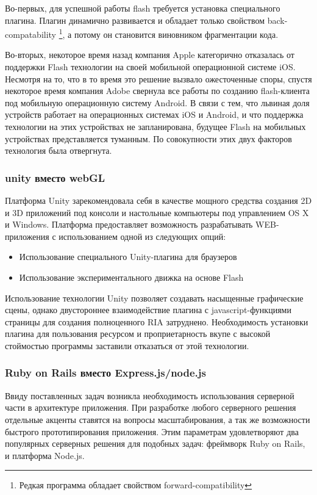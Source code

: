 \documentclass[12pt, a4paper]{article}
\begin{document}
Во-первых, для успешной работы flash требуется установка специального плагина. Плагин
динамично развивается и обладает только свойством back-compatability
\footnote{Редкая программа обладает свойством forward-compatibility}, а потому он
становится виновником фрагментации кода.

Во-вторых, некоторое время назад компания Apple категорично отказалась от
поддержки Flash технологии на своей мобильной операционной системе iOS. Несмотря
на то, что в то время это решение вызвало ожесточенные споры, спустя некоторое
время компания Adobe свернула все работы по созданию flash-клиента под мобильную
операционную систему Android. В связи с тем, что львиная доля устройств работает
на операционных системах iOS и Android, и что поддержка технологии на этих
устройствах не запланирована, будущее Flash на мобильных устройствах
представляется туманным. По совокупности этих двух факторов технология была
отвергнута.

\subsubsection{unity вместо webGL}
Платформа Unity зарекомендовала себя в качестве мощного средства создания 2D и
3D приложений под консоли и настольные компьютеры под управлением OS X и
Windows. Платформа предоставляет возможность разрабатывать WEB-приложения с
использованием одной из следующих опций:
\begin{itemize}
    \item Использование специального Unity-плагина для браузеров
    \item Использование экспериментального движка на основе Flash
\end{itemize}
Использование технологии Unity позволяет создавать насыщенные графические сцены,
однако двустороннее взаимодействие плагина с javascript-функциями страницы для
создания полноценного RIA затруднено. Необходимость установки плагина для
пользования ресурсом и проприетарность вкупе с высокой стоймостью программы
заставили отказаться от этой технологии.

\subsubsection{Ruby on Rails вместо Express.js/node.js}
Ввиду поставленных задач возникла необходимость использования серверной части в
архитектуре приложения. При разработке любого серверного решения отдельные
акценты ставятся на вопросы масштабирования, а так же возможности быстрого
прототипирования приложения. Этим параметрам удовлетворяют два популярных
серверных решения для подобных задач: фреймворк Ruby on Rails, и платформа
Node.js.
\end{document}
